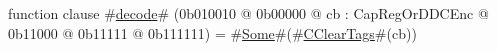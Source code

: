function clause #\hyperref[zdecode]{decode}# (0b010010 @ 0b00000 @ cb : CapRegOrDDCEnc @    0b11000 @    0b11111 @ 0b111111) = #\hyperref[zSome]{Some}#(#\hyperref[zCClearTags]{CClearTags}#(cb))

